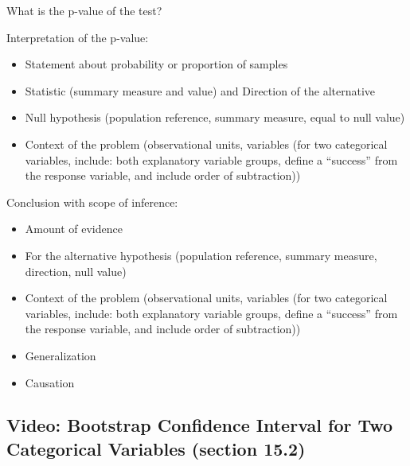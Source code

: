 \documentclass[
]{report}
\begin{document}
\vspace{0.3in}

What is the p-value of the test?

\vspace{0.2in}

Interpretation of the p-value:

\begin{itemize}
\item
  Statement about probability or proportion of samples
\item
  Statistic (summary measure and value) and Direction of the alternative
\item
  Null hypothesis (population reference, summary measure, equal to null value)
\item
  Context of the problem (observational units, variables (for two categorical variables, include: both explanatory variable groups, define a ``success'' from the response variable, and include order of subtraction))
\end{itemize}

\vspace{0.8in}

\newpage

Conclusion with scope of inference:

\begin{itemize}
\item
  Amount of evidence
\item
  For the alternative hypothesis (population reference, summary measure, direction, null value)
\item
  Context of the problem (observational units, variables (for two categorical variables, include: both explanatory variable groups, define a ``success'' from the response variable, and include order of subtraction))
\item
  Generalization
\item
  Causation
\end{itemize}

\vspace{0.8in}

\subsection*{Video: Bootstrap Confidence Interval for Two Categorical Variables (section 15.2)}\label{video-bootstrap-confidence-interval-for-two-categorical-variables-section-15.2}
\end{document}

